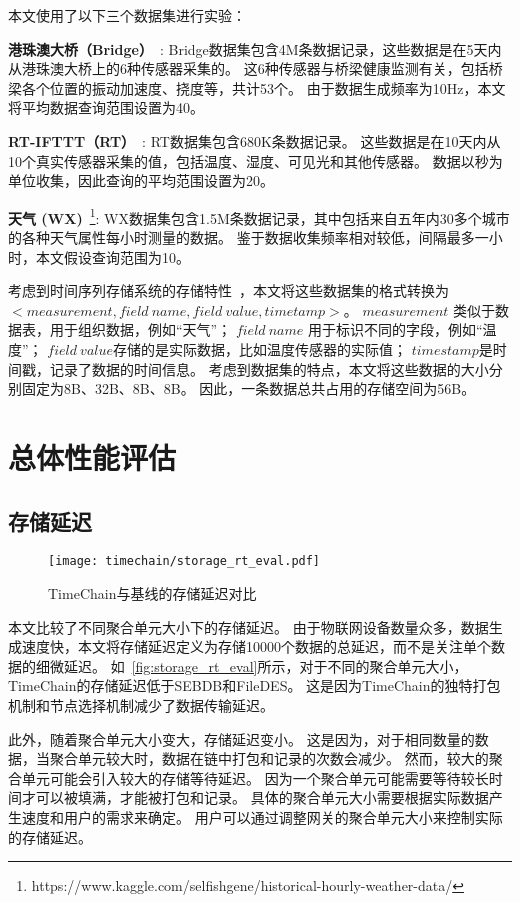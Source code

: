 本文使用了以下三个数据集进行实验：

\textbf{港珠澳大桥（Bridge）}~\cite{zhang2023edge}:
Bridge数据集包含4M条数据记录，这些数据是在5天内从港珠澳大桥上的6种传感器采集的。
这6种传感器与桥梁健康监测有关，包括桥梁各个位置的振动加速度、挠度等，共计53个。
由于数据生成频率为10Hz，本文将平均数据查询范围设置为40。

\textbf{RT-IFTTT（RT）}~\cite{heo2017rt}:
RT数据集包含680K条数据记录。
这些数据是在10天内从10个真实传感器采集的值，包括温度、湿度、可见光和其他传感器。
数据以秒为单位收集，因此查询的平均范围设置为20。

\textbf{天气 (WX)}~\footnote{https://www.kaggle.com/selfishgene/historical-hourly-weather-data/}:
WX数据集包含1.5M条数据记录，其中包括来自五年内30多个城市的各种天气属性每小时测量的数据。
鉴于数据收集频率相对较低，间隔最多一小时，本文假设查询范围为10。

考虑到时间序列存储系统的存储特性~\cite{naqvi2017time}，本文将这些数据集的格式转换为\\ $<measurement, field~name, field~value, timetamp>$。
$measurement$ 类似于数据表，用于组织数据，例如“天气”；
$field~name$ 用于标识不同的字段，例如“温度”；
$field~value$存储的是实际数据，比如温度传感器的实际值；
$timestamp$是时间戳，记录了数据的时间信息。
考虑到数据集的特点，本文将这些数据的大小分别固定为8B、32B、8B、8B。
因此，一条数据总共占用的存储空间为56B。

\section{总体性能评估}

\subsection{存储延迟}
\begin{figure}[t]
    \centering
    \texttt{[image: timechain/storage\_rt\_eval.pdf]}
    \caption{TimeChain与基线的存储延迟对比}
    \label{fig:storage_rt_eval}
\end{figure}
本文比较了不同聚合单元大小下的存储延迟。
由于物联网设备数量众多，数据生成速度快，本文将存储延迟定义为存储10000个数据的总延迟，而不是关注单个数据的细微延迟。
如~\autoref{fig:storage_rt_eval}所示，对于不同的聚合单元大小，TimeChain的存储延迟低于SEBDB和FileDES。
这是因为TimeChain的独特打包机制和节点选择机制减少了数据传输延迟。

此外，随着聚合单元大小变大，存储延迟变小。
这是因为，对于相同数量的数据，当聚合单元较大时，数据在链中打包和记录的次数会减少。
然而，较大的聚合单元可能会引入较大的存储等待延迟。
因为一个聚合单元可能需要等待较长时间才可以被填满，才能被打包和记录。
具体的聚合单元大小需要根据实际数据产生速度和用户的需求来确定。
用户可以通过调整网关的聚合单元大小来控制实际的存储延迟。

